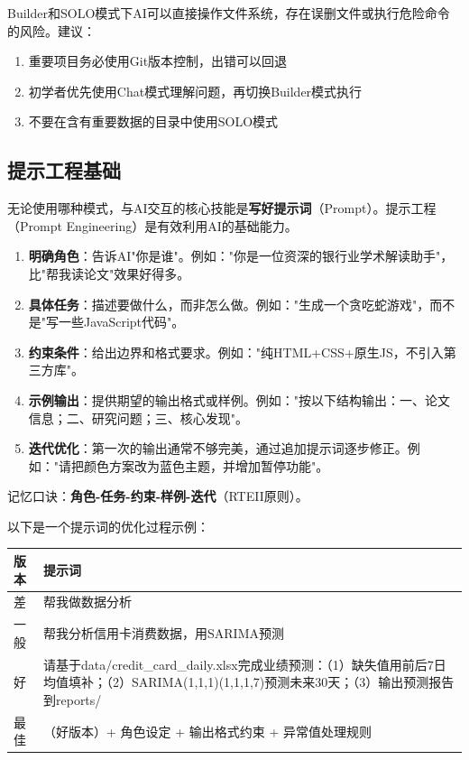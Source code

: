 \begin{warningbox}[安全提醒]
Builder和SOLO模式下AI可以直接操作文件系统，存在误删文件或执行危险命令的风险。建议：
\begin{enumerate}[leftmargin=2em]
  \item 重要项目务必使用Git版本控制，出错可以回退
  \item 初学者优先使用Chat模式理解问题，再切换Builder模式执行
  \item 不要在含有重要数据的目录中使用SOLO模式
\end{enumerate}
\end{warningbox}

\subsection{提示工程基础}

无论使用哪种模式，与AI交互的核心技能是\textbf{写好提示词}（Prompt）。提示工程（Prompt Engineering）是有效利用AI的基础能力。

\begin{theorybox}
\begin{enumerate}[leftmargin=2em]
  \item \textbf{明确角色}：告诉AI"你是谁"。例如："你是一位资深的银行业学术解读助手"，比"帮我读论文"效果好得多。
  \item \textbf{具体任务}：描述要做什么，而非怎么做。例如："生成一个贪吃蛇游戏"，而不是"写一些JavaScript代码"。
  \item \textbf{约束条件}：给出边界和格式要求。例如："纯HTML+CSS+原生JS，不引入第三方库"。
  \item \textbf{示例输出}：提供期望的输出格式或样例。例如："按以下结构输出：一、论文信息；二、研究问题；三、核心发现"。
  \item \textbf{迭代优化}：第一次的输出通常不够完美，通过追加提示词逐步修正。例如："请把颜色方案改为蓝色主题，并增加暂停功能"。
\end{enumerate}

记忆口诀：\textbf{角色-任务-约束-样例-迭代}（RTEII原则）。
\end{theorybox}

以下是一个提示词的优化过程示例：

\begin{table}[H]
\centering
\small
\begin{tabular}{lp{8cm}}
\toprule
\textbf{版本} & \textbf{提示词} \\
\midrule
差 & 帮我做数据分析 \\
一般 & 帮我分析信用卡消费数据，用SARIMA预测 \\
好 & 请基于data/credit\_card\_daily.xlsx完成业绩预测：（1）缺失值用前后7日均值填补；（2）SARIMA(1,1,1)(1,1,1,7)预测未来30天；（3）输出预测报告到reports/ \\
最佳 & （好版本）+ 角色设定 + 输出格式约束 + 异常值处理规则 \\
\bottomrule
\end{tabular}
\end{table}

